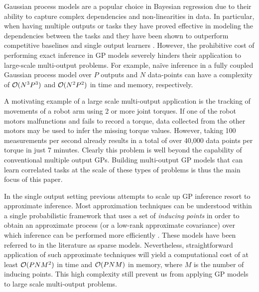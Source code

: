 Gaussian process models  \citep[GPs,][]{rasmussen-williams-book}  are a popular choice in 
Bayesian regression due to their ability to capture complex dependencies and non-linearities in data.
In particular, when having multiple outputs or tasks they have proved effective in modeling 
the dependencies between the tasks  and  they have been shown to outperform competitive baselines and 
single output learners  \citep{bonilla-et-al-nips-08,teh-et-al-aistats-05,alvarez-lawrence-nips-08,wilson-et-al-icml-12}.
However, the prohibitive cost of performing exact inference in  GP models severely hinders 
their application to  large-scale multi-output problems. For example, na\"{i}ve inference 
in a fully coupled Gaussian process model over $P$  outputs and $N$ data-points can have 
a complexity of $\mathcal{O}(N^3P^3)$  and $\mathcal{O}(N^2P^2)$ in time and memory, respectively.


A motivating  example of a large scale multi-output application 
is the tracking of  movements of a robot arm using 2 or more joint torques. 
If one of the robot motors malfunctions and fails to record a torque, data collected from the 
other motors may be used to infer the missing torque values.
However, taking 100 measurements per second already results in a total of over 40,000 data points 
per torque in just 7 minutes.
Clearly this problem is well beyond the capability of conventional multiple output GPs.
Building  multi-output GP models that can learn correlated tasks at the scale of 
these types of problems  is thus the main focus of this paper.

In the single output setting previous attempts to scale up  GP inference 
resort to approximate inference. Most  approximation techniques 
 can be understood 
within a single probabilistic framework that uses a set of \emph{inducing points}  in order to 
obtain an approximate process (or a low-rank approximate covariance) over which inference can be 
performed more efficiently \citep{quinonero2005unifying}. These models have been referred 
to in the literature as sparse models. 
Nevertheless, straightforward application of such approximate techniques will yield a computational 
cost of at least $\mathcal{O}(PNM^2)$ in time and  $\mathcal{O}(PNM)$ in memory, where 
$M$ is the number of inducing points. This high complexity still prevent us from applying GP models 
to  large scale multi-output problems.

